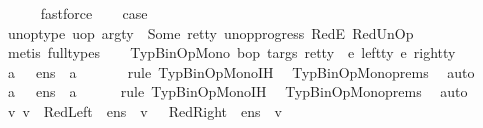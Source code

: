 \begin{isabellebody}
\ \ \ \ \isamarkupfalse%
\ fastforce\isanewline
\ \ \isamarkupfalse%
\ {\isacharquery}{\kern0pt}case\ \isamarkupfalse%
\ {\isacartoucheopen}unop{\isacharunderscore}{\kern0pt}type\ uop\ arg{\isacharunderscore}{\kern0pt}ty\ {\isacharequal}{\kern0pt}\ Some\ ret{\isacharunderscore}{\kern0pt}ty{\isacartoucheclose}\ unop{\isacharunderscore}{\kern0pt}progress\ RedE\ RedUnOp\isanewline
\ \ \ \ \isamarkupfalse%
\ {\isacharparenleft}{\kern0pt}metis\ {\isacharparenleft}{\kern0pt}full{\isacharunderscore}{\kern0pt}types{\isacharparenright}{\kern0pt}{\isacharparenright}{\kern0pt}\isanewline
{}\isamarkupfalse%
\isanewline
\ \ \isamarkupfalse%
\ {\isacharparenleft}{\kern0pt}TypBinOpMono\ bop\ targs\ ret{\isacharunderscore}{\kern0pt}ty\ {\isasymDelta}\ e{}\ left{\isacharunderscore}{\kern0pt}ty\ e{}\ right{\isacharunderscore}{\kern0pt}ty{\isacharparenright}{\kern0pt}\isanewline
\ \ \isamarkupfalse%
\ {\isachardoublequoteopen}{\isasymexists}a{\isachardot}{\kern0pt}\ {\isasymLambda}{\isacharcomma}{\kern0pt}{\isasymGamma}{\isacharcomma}{\kern0pt}{\isasymOmega}\ {\isasymturnstile}\ {\isasymlangle}e{}{\isacharcomma}{\kern0pt}n{\isacharunderscore}{\kern0pt}s{\isasymrangle}\ {\isasymDown}\ a{\isachardoublequoteclose}\ \isanewline
\ \ \ \ \isamarkupfalse%
\ {\isacharparenleft}{\kern0pt}rule\ TypBinOpMono{\isachardot}{\kern0pt}IH{\isacharparenright}{\kern0pt}\ \isamarkupfalse%
\ TypBinOpMono{\isachardot}{\kern0pt}prems\ \isamarkupfalse%
\ auto\isanewline
\ \ \isamarkupfalse%
\ \isamarkupfalse%
\ {\isachardoublequoteopen}{\isasymexists}a{\isachardot}{\kern0pt}\ {\isasymLambda}{\isacharcomma}{\kern0pt}{\isasymGamma}{\isacharcomma}{\kern0pt}{\isasymOmega}\ {\isasymturnstile}\ {\isasymlangle}e{}{\isacharcomma}{\kern0pt}n{\isacharunderscore}{\kern0pt}s{\isasymrangle}\ {\isasymDown}\ a{\isachardoublequoteclose}\isanewline
\ \ \ \ \isamarkupfalse%
\ {\isacharparenleft}{\kern0pt}rule\ TypBinOpMono{\isachardot}{\kern0pt}IH{\isacharparenright}{\kern0pt}\ \isamarkupfalse%
\ TypBinOpMono{\isachardot}{\kern0pt}prems\ \isamarkupfalse%
\ auto\isanewline
\ \ \isamarkupfalse%
\ \ \isamarkupfalse%
\ v{}\ v{}\ \ RedLeft{\isacharcolon}{\kern0pt}{\isachardoublequoteopen}{\isasymLambda}{\isacharcomma}{\kern0pt}{\isasymGamma}{\isacharcomma}{\kern0pt}{\isasymOmega}\ {\isasymturnstile}\ {\isasymlangle}e{}{\isacharcomma}{\kern0pt}n{\isacharunderscore}{\kern0pt}s{\isasymrangle}\ {\isasymDown}\ v{}{\isachardoublequoteclose}\ \ \ RedRight{\isacharcolon}{\kern0pt}{\isachardoublequoteopen}{\isasymLambda}{\isacharcomma}{\kern0pt}{\isasymGamma}{\isacharcomma}{\kern0pt}{\isasymOmega}\ {\isasymturnstile}\ {\isasymlangle}e{}{\isacharcomma}{\kern0pt}n{\isacharunderscore}{\kern0pt}s{\isasymrangle}\ {\isasymDown}\ v{}{\isachardoublequoteclose}\isanewline

\end{isabellebody}
